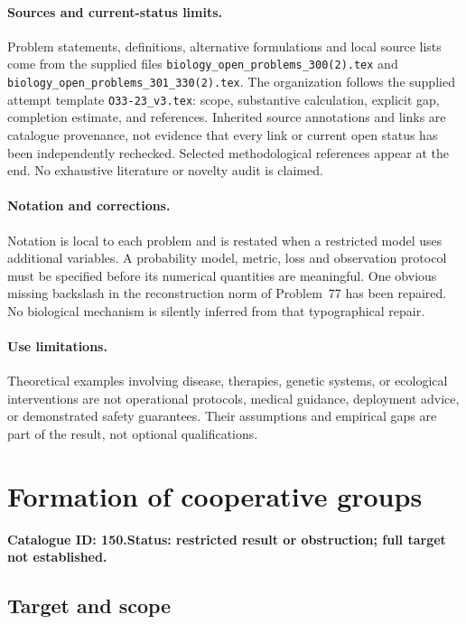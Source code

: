 \documentclass[11pt]{article}
\begin{document}
\paragraph{Sources and current-status limits.}
Problem statements, definitions, alternative formulations and local source lists
come from the supplied files
\texttt{biology\_open\_problems\_300(2).tex} and
\texttt{biology\_open\_problems\_301\_330(2).tex}.
The organization follows the supplied attempt template
\texttt{O33-23\_v3.tex}: scope, substantive calculation, explicit gap,
completion estimate, and references. Inherited source annotations and links are
catalogue provenance, not evidence that every link or current open status has
been independently rechecked. Selected methodological references appear at the
end. No exhaustive literature or novelty audit is claimed.

\paragraph{Notation and corrections.}
Notation is local to each problem and is restated when a restricted model uses
additional variables. A probability model, metric, loss and observation protocol
must be specified before its numerical quantities are meaningful. One obvious
missing backslash in the reconstruction norm of Problem~77 has been repaired.
No biological mechanism is silently inferred from that typographical repair.

\paragraph{Use limitations.}
Theoretical examples involving disease, therapies, genetic systems, or ecological
interventions are not operational protocols, medical guidance, deployment advice,
or demonstrated safety guarantees. Their assumptions and empirical gaps are part
of the result, not optional qualifications.

\setcounter{section}{149}
\section{Formation of cooperative groups}
\label{prob:150}
\noindent\textbf{Catalogue ID: 150.}\quad \textbf{Status: restricted result or obstruction; full target not established.}
\subsection{Target and scope}
\end{document}
